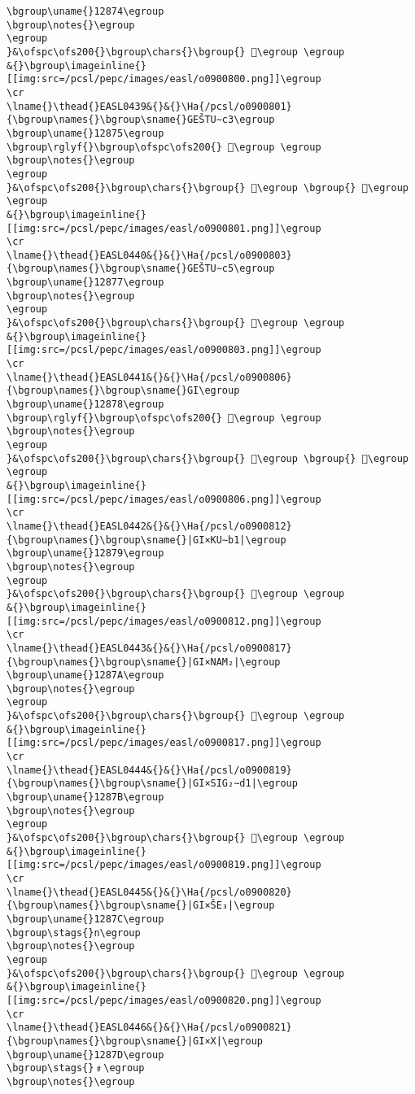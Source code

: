\begin{verbatim}
\bgroup\uname{}12874\egroup
\bgroup\notes{}\egroup
\egroup
}&\ofspc\ofs200{}\bgroup\chars{}\bgroup{} 𒡴\egroup \egroup
&{}\bgroup\imageinline{}[[img:src=/pcsl/pepc/images/easl/o0900800.png]]\egroup
\cr
\lname{}\thead{}EASL0439&{}&{}\Ha{/pcsl/o0900801}{\bgroup\names{}\bgroup\sname{}GEŠTU∼c3\egroup
\bgroup\uname{}12875\egroup
\bgroup\rglyf{}\bgroup\ofspc\ofs200{} 𒡵\egroup \egroup
\bgroup\notes{}\egroup
\egroup
}&\ofspc\ofs200{}\bgroup\chars{}\bgroup{} 𒡵\egroup \bgroup{} 𒡶\egroup \egroup
&{}\bgroup\imageinline{}[[img:src=/pcsl/pepc/images/easl/o0900801.png]]\egroup
\cr
\lname{}\thead{}EASL0440&{}&{}\Ha{/pcsl/o0900803}{\bgroup\names{}\bgroup\sname{}GEŠTU∼c5\egroup
\bgroup\uname{}12877\egroup
\bgroup\notes{}\egroup
\egroup
}&\ofspc\ofs200{}\bgroup\chars{}\bgroup{} 𒡷\egroup \egroup
&{}\bgroup\imageinline{}[[img:src=/pcsl/pepc/images/easl/o0900803.png]]\egroup
\cr
\lname{}\thead{}EASL0441&{}&{}\Ha{/pcsl/o0900806}{\bgroup\names{}\bgroup\sname{}GI\egroup
\bgroup\uname{}12878\egroup
\bgroup\rglyf{}\bgroup\ofspc\ofs200{} 𒡸\egroup \egroup
\bgroup\notes{}\egroup
\egroup
}&\ofspc\ofs200{}\bgroup\chars{}\bgroup{} 𒢄\egroup \bgroup{} 𒡸\egroup \egroup
&{}\bgroup\imageinline{}[[img:src=/pcsl/pepc/images/easl/o0900806.png]]\egroup
\cr
\lname{}\thead{}EASL0442&{}&{}\Ha{/pcsl/o0900812}{\bgroup\names{}\bgroup\sname{}|GI×KU∼b1|\egroup
\bgroup\uname{}12879\egroup
\bgroup\notes{}\egroup
\egroup
}&\ofspc\ofs200{}\bgroup\chars{}\bgroup{} 𒡹\egroup \egroup
&{}\bgroup\imageinline{}[[img:src=/pcsl/pepc/images/easl/o0900812.png]]\egroup
\cr
\lname{}\thead{}EASL0443&{}&{}\Ha{/pcsl/o0900817}{\bgroup\names{}\bgroup\sname{}|GI×NAM₂|\egroup
\bgroup\uname{}1287A\egroup
\bgroup\notes{}\egroup
\egroup
}&\ofspc\ofs200{}\bgroup\chars{}\bgroup{} 𒡺\egroup \egroup
&{}\bgroup\imageinline{}[[img:src=/pcsl/pepc/images/easl/o0900817.png]]\egroup
\cr
\lname{}\thead{}EASL0444&{}&{}\Ha{/pcsl/o0900819}{\bgroup\names{}\bgroup\sname{}|GI×SIG₂∼d1|\egroup
\bgroup\uname{}1287B\egroup
\bgroup\notes{}\egroup
\egroup
}&\ofspc\ofs200{}\bgroup\chars{}\bgroup{} 𒡻\egroup \egroup
&{}\bgroup\imageinline{}[[img:src=/pcsl/pepc/images/easl/o0900819.png]]\egroup
\cr
\lname{}\thead{}EASL0445&{}&{}\Ha{/pcsl/o0900820}{\bgroup\names{}\bgroup\sname{}|GI×ŠE₃|\egroup
\bgroup\uname{}1287C\egroup
\bgroup\stags{}n\egroup
\bgroup\notes{}\egroup
\egroup
}&\ofspc\ofs200{}\bgroup\chars{}\bgroup{} 𒡼\egroup \egroup
&{}\bgroup\imageinline{}[[img:src=/pcsl/pepc/images/easl/o0900820.png]]\egroup
\cr
\lname{}\thead{}EASL0446&{}&{}\Ha{/pcsl/o0900821}{\bgroup\names{}\bgroup\sname{}|GI×X|\egroup
\bgroup\uname{}1287D\egroup
\bgroup\stags{}﹟\egroup
\bgroup\notes{}\egroup

\end{verbatim}
